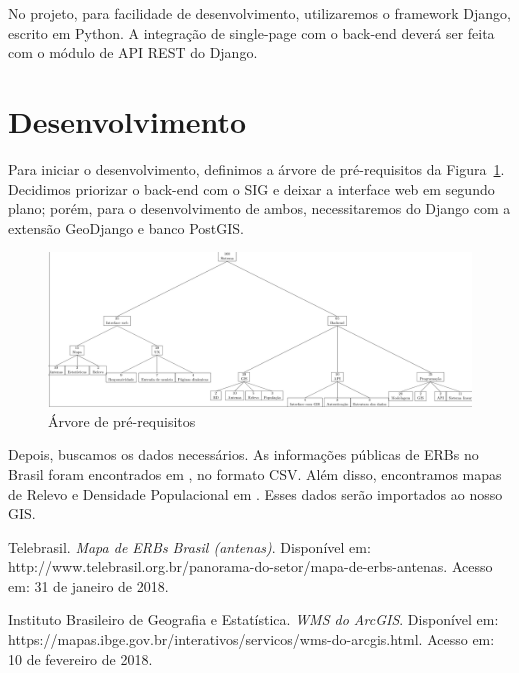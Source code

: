 \documentclass[12pt,a4paper]{article}
\begin{document}
No projeto, para facilidade de desenvolvimento, utilizaremos o framework Django,
escrito em Python. A integração de single-page com o back-end deverá ser feita
com o módulo de API REST do Django.

\section{Desenvolvimento}

Para iniciar o desenvolvimento, definimos a árvore de pré-requisitos da
Figura~\ref{fig:prerequisitos}. Decidimos priorizar o back-end com o SIG e
deixar a interface web em segundo plano; porém, para o desenvolvimento de ambos,
necessitaremos do Django com a extensão GeoDjango e banco PostGIS.

\begin{figure}[htp]
    \centering
    \includegraphics[width=1.4\textwidth, angle=270]{../misc/arvore_prerequisitos.pdf}
	\caption{Árvore de pré-requisitos}
	\label{fig:prerequisitos}
\end{figure}

Depois, buscamos os dados necessários. As informações públicas de ERBs no Brasil
foram encontrados em \cite{mapa-erb}, no formato CSV. Além disso, encontramos
mapas de Relevo e Densidade Populacional em \cite{mapa-ibge}. Esses dados serão
importados ao nosso GIS.

\begin{thebibliography}{9}

Telebrasil.
\textit{Mapa de ERBs Brasil (antenas)}.
Disponível em: http://www.telebrasil.org.br/panorama-do-setor/mapa-de-erbs-antenas.
Acesso em: 31 de janeiro de 2018.

Instituto Brasileiro de Geografia e Estatística.
\textit{WMS do ArcGIS}.
Disponível em: https://mapas.ibge.gov.br/interativos/servicos/wms-do-arcgis.html.
Acesso em: 10 de fevereiro de 2018.

\end{thebibliography}
\end{document}
